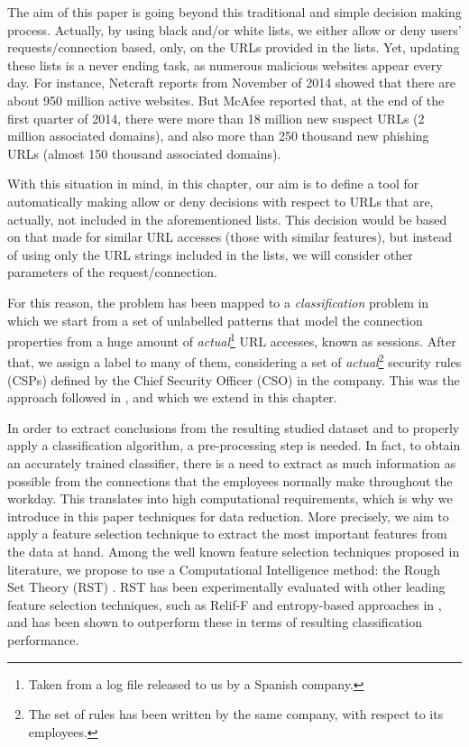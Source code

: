 \documentclass{llncs}
\begin{document}
The aim of this paper is going beyond this traditional and simple decision making process. Actually, by using black
and/or white lists, we either allow or deny users' requests/connection based, only, on the URLs provided in the lists.
Yet, updating these lists is a never ending task, as numerous malicious websites appear every day.
For instance, Netcraft reports from November of 2014 \cite{netcraft:site} showed that there are about 950
million active websites. But McAfee reported \cite{mcafee:site} that, at the end of the first quarter of 2014,
there were more than 18 million new suspect URLs (2 million associated domains), and also more than 250 thousand
new phishing URLs (almost 150 thousand associated domains).

With this situation in mind, in this chapter, our aim is to define a tool for automatically making allow or
deny decisions with respect to URLs that are, actually, not included in the aforementioned lists. This decision
would be based on that made for similar URL accesses (those with similar features), but instead of using only
the URL strings included in the lists, we will consider other parameters of the request/connection.

For this reason, the problem has been mapped to a \textit{classification} problem in which we start from a set of
unlabelled patterns that model the connection properties from a huge amount of \textit{actual}\footnote{Taken from a
log file released to   us by a  Spanish company.} URL accesses, known as sessions. After that, we assign a label to many
of them, considering a set of \textit{actual}\footnote{The set of rules has been written by the same   company, with respect
to its employees.} security rules (CSPs) defined by the Chief Security Officer (CSO) in the company. This was the approach
followed in \cite{ECTA}, and which we extend in this chapter.

In order to extract conclusions from the resulting studied dataset and to properly apply a classification algorithm,
a pre-processing step is needed. In fact, to obtain an accurately trained classifier, there is a need to extract as much
information as possible from the connections
that the employees normally make throughout the workday. This translates into high computational requirements, which is
why we introduce in this paper  techniques for data reduction. More precisely, we aim to apply a feature selection
technique to extract the most important features from the data at hand. Among the well known feature selection techniques
proposed in literature, we propose to use a Computational Intelligence method: the Rough Set Theory (RST) \cite{pawlak2008rough}. RST has been experimentally
evaluated with other leading feature selection techniques, such as Relif-F and entropy-based approaches
in \cite{jensen2007fuzzy}, and has been shown to outperform these in terms of resulting classification performance.
\end{document}
